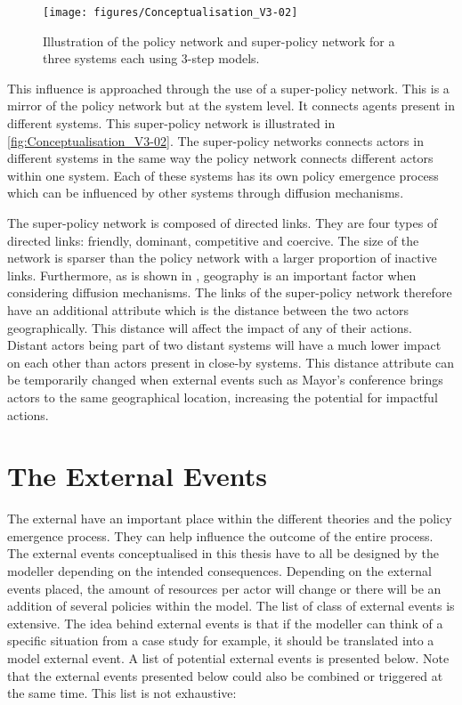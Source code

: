 \begin{figure}
\centering
\texttt{[image: figures/Conceptualisation\_V3-02]}
\caption{Illustration of the policy network and super-policy network for a three systems each using 3-step models.}
\label{fig:Conceptualisation_V3-02}
\end{figure}

This influence is approached through the use of a super-policy network. This is a mirror of the policy network but at the system level. It connects agents present in different systems. This super-policy network is illustrated in \autoref{fig:Conceptualisation_V3-02}. The super-policy networks connects actors in different systems in the same way the policy network connects different actors within one system. Each of these systems has its own policy emergence process which can be influenced by other systems through diffusion mechanisms.

The super-policy network is composed of directed links. They are four types of directed links: friendly, dominant, competitive and coercive. The size of the network is sparser than the policy network with a larger proportion of inactive links. Furthermore, as is shown in \cite{gray1973innovation, walker1969diffusion}, geography is an important factor when considering diffusion mechanisms. The links of the super-policy network therefore have an additional attribute which is the distance between the two actors geographically. This distance will affect the impact of any of their actions. Distant actors being part of two distant systems will have a much lower impact on each other than actors present in close-by systems. This distance attribute can be temporarily changed when external events such as Mayor's conference brings actors to the same geographical location, increasing the potential for impactful actions.
 
\section{The External Events}
\label{sec:externalEvents}
 
The external have an important place within the different theories and the policy emergence process. They can help influence the outcome of the entire process. The external events conceptualised in this thesis have to all be designed by the modeller depending on the intended consequences. Depending on the external events placed, the amount of resources per actor will change or there will be an addition of several policies within the model. The list of class of external events is extensive. The idea behind external events is that if the modeller can think of a specific situation from a case study for example, it should be translated into a model external event. A list of potential external events is presented below. Note that the external events presented below could also be combined or triggered at the same time. This list is not exhaustive:
 
